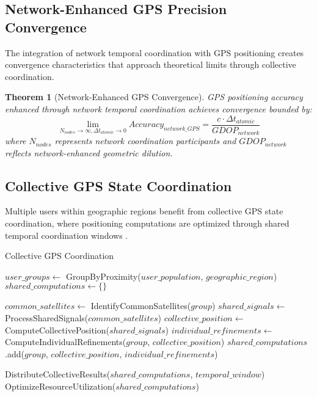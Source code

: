 \documentclass[12pt,a4paper]{article}
\newtheorem{theorem}{Theorem}[section]
\begin{document}
\subsection{Network-Enhanced GPS Precision Convergence}

The integration of network temporal coordination with GPS positioning creates convergence characteristics that approach theoretical limits through collective coordination.

\begin{theorem}[Network-Enhanced GPS Convergence]
GPS positioning accuracy enhanced through network temporal coordination achieves convergence bounded by:
\begin{equation}
\lim_{N_{nodes} \to \infty, \Delta t_{atomic} \to 0} Accuracy_{network\_GPS} = \frac{c \cdot \Delta t_{atomic}}{GDOP_{network}}
\end{equation}
where $N_{nodes}$ represents network coordination participants and $GDOP_{network}$ reflects network-enhanced geometric dilution.
\end{theorem}

\subsection{Collective GPS State Coordination}

Multiple users within geographic regions benefit from collective GPS state coordination, where positioning computations are optimized through shared temporal coordination windows \cite{cristian1989clock}.

\begin{algorithm}
\caption{Collective GPS Coordination}
\begin{algorithmic}[1]
    \State $user\_groups \gets$ GroupByProximity($user\_population$, $geographic\_region$)
    \State $shared\_computations \gets \{\}$
    
        \State $common\_satellites \gets$ IdentifyCommonSatellites($group$)
        \State $shared\_signals \gets$ ProcessSharedSignals($common\_satellites$)
        \State $collective\_position \gets$ ComputeCollectivePosition($shared\_signals$)
        \State $individual\_refinements \gets$ ComputeIndividualRefinements($group$, $collective\_position$)
        \State $shared\_computations$.add($group$, $collective\_position$, $individual\_refinements$)
    \EndFor
    
    \State DistributeCollectiveResults($shared\_computations$, $temporal\_window$)
    \State \Return OptimizeResourceUtilization($shared\_computations$)
\EndProcedure
\end{algorithmic}
\end{algorithm}
\end{document}
